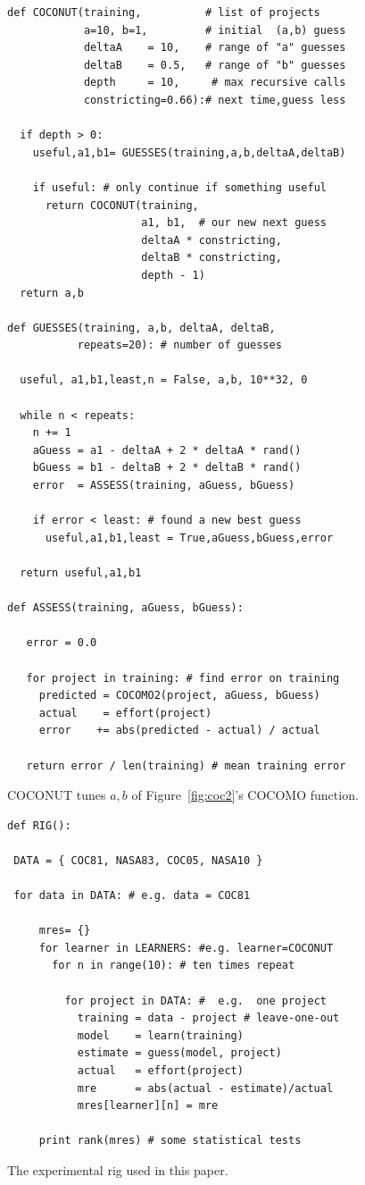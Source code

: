 \documentclass[smallcondesed]{svjour3}
\newcommand{\fig}[1]{Figure~\ref{fig:#1}}
\begin{document}
\begin{figure}
\begin{lstlisting}
def COCONUT(training,          # list of projects
            a=10, b=1,         # initial  (a,b) guess
            deltaA    = 10,    # range of "a" guesses 
            deltaB    = 0.5,   # range of "b" guesses
            depth     = 10,     # max recursive calls
            constricting=0.66):# next time,guess less
            
  if depth > 0:
    useful,a1,b1= GUESSES(training,a,b,deltaA,deltaB)
    
    if useful: # only continue if something useful
      return COCONUT(training, 
                     a1, b1,  # our new next guess
                     deltaA * constricting,
                     deltaB * constricting,
                     depth - 1)
  return a,b

def GUESSES(training, a,b, deltaA, deltaB,
           repeats=20): # number of guesses
           
  useful, a1,b1,least,n = False, a,b, 10**32, 0
  
  while n < repeats:
    n += 1
    aGuess = a1 - deltaA + 2 * deltaA * rand()
    bGuess = b1 - deltaB + 2 * deltaB * rand()
    error  = ASSESS(training, aGuess, bGuess)
    
    if error < least: # found a new best guess
      useful,a1,b1,least = True,aGuess,bGuess,error
      
  return useful,a1,b1

def ASSESS(training, aGuess, bGuess):

   error = 0.0
   
   for project in training: # find error on training
     predicted = COCOMO2(project, aGuess, bGuess)
     actual    = effort(project)
     error    += abs(predicted - actual) / actual
     
   return error / len(training) # mean training error
\end{lstlisting}
\caption{COCONUT  tunes  $a,b$ 
of \fig{coc2}'s COCOMO function.}\label{fig:coconut}
\end{figure}




\begin{figure}
\begin{lstlisting}
def RIG():

 DATA = { COC81, NASA83, COC05, NASA10 }
 
 for data in DATA: # e.g. data = COC81
 
     mres= {}
     for learner in LEARNERS: #e.g. learner=COCONUT 
       for n in range(10): # ten times repeat
       
         for project in DATA: #  e.g.  one project
           training = data - project # leave-one-out
           model    = learn(training)
           estimate = guess(model, project)
           actual   = effort(project)
           mre      = abs(actual - estimate)/actual
           mres[learner][n] = mre
           
     print rank(mres) # some statistical tests
\end{lstlisting}
\caption{The experimental rig used in this paper.}\label{fig:rig}
\end{figure}
\end{document}
